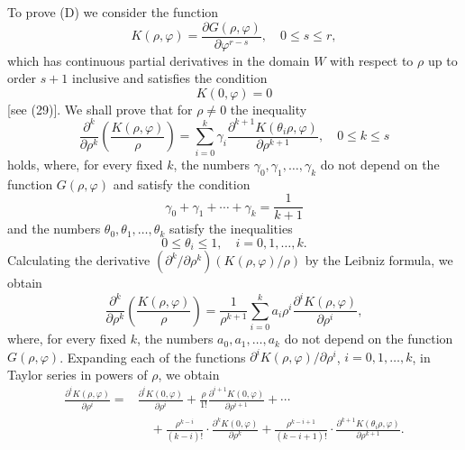 \documentclass[10pt,a5paper]{book}
\makeatletter
\theoremstyle{plain}
\theoremstyle{definition}
\theoremstyle{remark}
\renewenvironment{proof}[1][\proofname]{\par
  \pushQED{\qed}%
  \normalfont\topsep6\p@\@plus6\p@\relax
  \trivlist
  \item\relax{\itshape #1\@addpunct{.}}\hspace\labelsep\ignorespaces
}{\popQED\endtrivlist\@endpefalse}
\makeatother
\begin{document}
\begin{proof}
To prove (D) we consider the function
\begin{equation*}
K(\rho, \varphi)=\frac{\partial G(\rho, \varphi)}{\partial \varphi^{r-s}}, \quad 0 \leq s \leq r, \tag{32}
\end{equation*}
which has continuous partial derivatives in the domain $W$ with respect to $\rho$ up to order $s+1$ inclusive and satisfies the condition
\begin{equation*}
K(0, \varphi)=0 \tag{33}
\end{equation*}
[see (29)]. We shall prove that for $\rho \neq 0$ the inequality
\begin{equation*}
\frac{\partial^{k}}{\partial \rho^{k}}\left(\frac{K(\rho, \varphi)}{\rho}\right)=\sum_{i=0}^{k} \gamma_{i} \frac{\partial^{k+1} K\left(\theta_{i} \rho, \varphi\right)}{\partial \rho^{k+1}}, \quad 0 \leq k \leq s \tag{34}
\end{equation*}
holds, where, for every fixed $k$, the numbers $\gamma_{0}, \gamma_{1}, \ldots, \gamma_{k}$ do not depend on the function $G(\rho, \varphi)$ and satisfy the condition
\begin{equation*}
\gamma_{0}+\gamma_{1}+\cdots+\gamma_{k}=\frac{1}{k+1} \tag{35}
\end{equation*}
and the numbers $\theta_{0}, \theta_{1}, \ldots, \theta_{k}$ satisfy the inequalities
\begin{equation*}
0 \leq \theta_{i} \leq 1, \quad i=0,1, \ldots, k . \tag{36}
\end{equation*}
Calculating the derivative $\left(\partial^{k} / \partial \rho^{k}\right)(K(\rho, \varphi) / \rho)$ by the Leibniz formula, we obtain
\begin{equation*}
\frac{\partial^{k}}{\partial \rho^{k}}\left(\frac{K(\rho, \varphi)}{\rho}\right)=\frac{1}{\rho^{k+1}} \sum_{i=0}^{k} a_{i} \rho^{i} \frac{\partial^{i} K(\rho, \varphi)}{\partial \rho^{i}}, \tag{37}
\end{equation*}
where, for every fixed $k$, the numbers $a_{0}, a_{1}, \ldots, a_{k}$ do not depend on the function $G(\rho, \varphi)$. Expanding each of the functions $\partial^{i} K(\rho, \varphi) / \partial \rho^{i}$, $i=0,1, \ldots, k$, in Taylor series in powers of $\rho$, we obtain
\begin{align*}
\frac{\partial^{i} K(\rho, \varphi)}{\partial \rho^{i}}= & \frac{\partial^{i} K(0, \varphi)}{\partial \rho^{i}}+\frac{\rho}{1!} \frac{\partial^{i+1} K(0, \varphi)}{\partial \rho^{i+1}}+\cdots \\
& \quad+\frac{\rho^{k-i}}{(k-i)!} \cdot \frac{\partial^{k} K(0, \varphi)}{\partial \rho^{k}}+\frac{\rho^{k-i+1}}{(k-i+1)!} \cdot \frac{\partial^{k+1} K\left(\theta_{i} \rho, \varphi\right)}{\partial \rho^{k+1}} . \tag{38}

\end{align*}
\end{proof}
\end{document}
